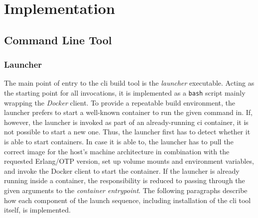 \section{Implementation}

\subsection{Command Line Tool}

\subsubsection{Launcher} The main point of entry to the \acrshort{cli} build tool is the \emph{launcher} executable. Acting as the starting point for all invocations, it is implemented as a \lstinline|bash| script mainly wrapping the \emph{Docker} client. To provide a repeatable build environment, the launcher prefers to start a well-known container to run the given command in. If, however, the launcher is invoked as part of an already-running \acrshort{ci} container, it is not possible to start a new one. Thus, the launcher first has to detect whether it is able to start containers. In case it is able to, the launcher has to pull the correct image for the host's machine architecture in combination with the requested Erlang/OTP version, set up volume mounts and environment variables, and invoke the Docker client to start the container. If the launcher is already running inside a container, the responsibility is reduced to passing through the given arguments to the \emph{container entrypoint}. The following paragraphs describe how each component of the launch sequence, including installation of the \acrshort{cli} tool itself, is implemented.

